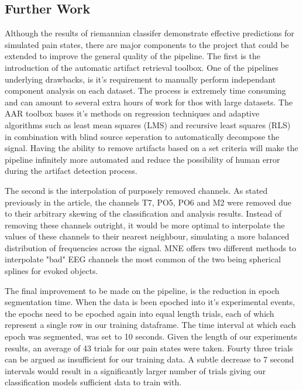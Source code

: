 \documentclass[11pt]{article}
\begin{document}
\subsection{Further Work}

Although the results of riemannian classifer demonstrate effective predictions for simulated pain states, there are major components to the project that could be extended to improve the general quality of the pipeline. The first is the introduction of the automatic artifact retrieval toolbox. One of the pipelines underlying drawbacks, is it's requirement to manually perform independant component analysis on each dataset. The process is extremely time consuming and can amount to several extra hours of work for thos with large datasets. The AAR toolbox bases it's methods on regression techniques and adaptive algorithms such as least mean squares (LMS) and recursive least squares (RLS) in combination with blind source seperation to automatically decompose the signal. Having the ability to remove artifacts based on a set criteria will make the pipeline infinitely more automated and reduce the possibility of human error during the artifact detection process.

The second is the interpolation of purposely removed channels. As stated previously in the article, the channels T7, PO5, PO6 and M2 were removed due to their arbitrary skewing of the classification and analysis results. Instead of removing these channels outright, it would be more optimal to interpolate the values of these channels to their nearest neighbour, simulating a more balanced distribution of frequencies across the signal. MNE offers two different methods to interpolate "bad" EEG channels the most common of the two being spherical splines for evoked objects. 

The final improvement to be made on the pipeline, is the reduction in epoch segmentation time. When the data is been epoched into it's experimental events, the epochs need to be epoched again into equal length trials, each of which represent a single row in our training dataframe. The time interval at which each epoch was segmented, was set to 10 seconds. Given the length of our experiments results, an average of 43 trials for our pain states were taken. Fourty three trials can be argued as insufficient for our training data. A subtle decrease to 7 second intervals would result in a significantly larger number of trials giving our classification models sufficient data to train with.





\end{document}
